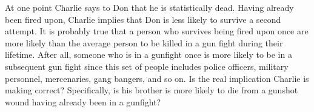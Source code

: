 
At one point Charlie says to Don that he is statistically dead. Having already been fired upon, Charlie implies that Don is less likely to survive a second attempt. It is probably true that a person who survives being fired upon once are more likely than the average person to be killed in a gun fight during their lifetime. After all, someone who is in a gunfight once is more likely to be in a subsequent gun fight since this set of people includes police officers, military personnel, mercenaries, gang bangers, and so on. Is the real implication Charlie is making correct? Specifically, is his brother is more likely to die from a gunshot wound having already been in a gunfight?